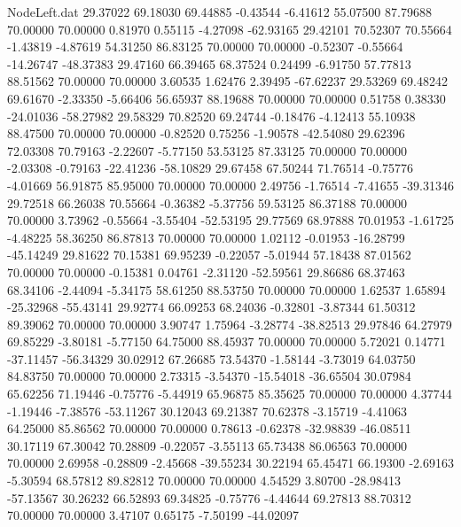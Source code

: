 \begin{filecontents}{NodeLeft.dat}
  29.37022   69.18030   69.44885    -0.43544   -6.41612   55.07500   87.79688   70.00000   70.00000    0.81970    0.55115   -4.27098  -62.93165
  29.42101   70.52307   70.55664    -1.43819   -4.87619   54.31250   86.83125   70.00000   70.00000   -0.52307   -0.55664  -14.26747  -48.37383
  29.47160   66.39465   68.37524     0.24499   -6.91750   57.77813   88.51562   70.00000   70.00000    3.60535    1.62476    2.39495  -67.62237
  29.53269   69.48242   69.61670    -2.33350   -5.66406   56.65937   88.19688   70.00000   70.00000    0.51758    0.38330  -24.01036  -58.27982
  29.58329   70.82520   69.24744    -0.18476   -4.12413   55.10938   88.47500   70.00000   70.00000   -0.82520    0.75256   -1.90578  -42.54080
  29.62396   72.03308   70.79163    -2.22607   -5.77150   53.53125   87.33125   70.00000   70.00000   -2.03308   -0.79163  -22.41236  -58.10829
  29.67458   67.50244   71.76514    -0.75776   -4.01669   56.91875   85.95000   70.00000   70.00000    2.49756   -1.76514   -7.41655  -39.31346
  29.72518   66.26038   70.55664    -0.36382   -5.37756   59.53125   86.37188   70.00000   70.00000    3.73962   -0.55664   -3.55404  -52.53195
  29.77569   68.97888   70.01953    -1.61725   -4.48225   58.36250   86.87813   70.00000   70.00000    1.02112   -0.01953  -16.28799  -45.14249
  29.81622   70.15381   69.95239    -0.22057   -5.01944   57.18438   87.01562   70.00000   70.00000   -0.15381    0.04761   -2.31120  -52.59561
  29.86686   68.37463   68.34106    -2.44094   -5.34175   58.61250   88.53750   70.00000   70.00000    1.62537    1.65894  -25.32968  -55.43141
  29.92774   66.09253   68.24036    -0.32801   -3.87344   61.50312   89.39062   70.00000   70.00000    3.90747    1.75964   -3.28774  -38.82513
  29.97846   64.27979   69.85229    -3.80181   -5.77150   64.75000   88.45937   70.00000   70.00000    5.72021    0.14771  -37.11457  -56.34329
  30.02912   67.26685   73.54370    -1.58144   -3.73019   64.03750   84.83750   70.00000   70.00000    2.73315   -3.54370  -15.54018  -36.65504
  30.07984   65.62256   71.19446    -0.75776   -5.44919   65.96875   85.35625   70.00000   70.00000    4.37744   -1.19446   -7.38576  -53.11267
  30.12043   69.21387   70.62378    -3.15719   -4.41063   64.25000   85.86562   70.00000   70.00000    0.78613   -0.62378  -32.98839  -46.08511
  30.17119   67.30042   70.28809    -0.22057   -3.55113   65.73438   86.06563   70.00000   70.00000    2.69958   -0.28809   -2.45668  -39.55234
  30.22194   65.45471   66.19300    -2.69163   -5.30594   68.57812   89.82812   70.00000   70.00000    4.54529    3.80700  -28.98413  -57.13567
  30.26232   66.52893   69.34825    -0.75776   -4.44644   69.27813   88.70312   70.00000   70.00000    3.47107    0.65175   -7.50199  -44.02097

\end{filecontents}

